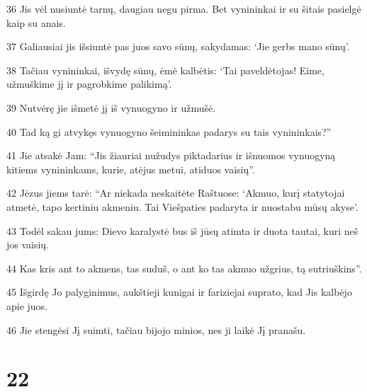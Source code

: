\par 36 Jis vėl nusiuntė tarnų, daugiau negu pirma. Bet vynininkai ir su šitais pasielgė kaip su anais. 
\par 37 Galiausiai jis išsiuntė pas juos savo sūnų, sakydamas: ‘Jie gerbs mano sūnų’. 
\par 38 Tačiau vynininkai, išvydę sūnų, ėmė kalbėtis: ‘Tai paveldėtojas! Eime, užmuškime jį ir pagrobkime palikimą’. 
\par 39 Nutvėrę jie išmetė jį iš vynuogyno ir užmušė. 
\par 40 Tad ką gi atvykęs vynuogyno šeimininkas padarys su tais vynininkais?” 
\par 41 Jie atsakė Jam: “Jis žiauriai nužudys piktadarius ir išnuomos vynuogyną kitiems vynininkams, kurie, atėjus metui, atiduos vaisių”. 
\par 42 Jėzus jiems tarė: “Ar niekada neskaitėte Raštuose: ‘Akmuo, kurį statytojai atmetė, tapo kertiniu akmeniu. Tai Viešpaties padaryta ir nuostabu mūsų akyse’. 
\par 43 Todėl sakau jums: Dievo karalystė bus iš jūsų atimta ir duota tautai, kuri neš jos vaisių. 
\par 44 Kas kris ant to akmens, tas suduš, o ant ko tas akmuo užgrius, tą sutriuškins”. 
\par 45 Išgirdę Jo palyginimus, aukštieji kunigai ir fariziejai suprato, kad Jis kalbėjo apie juos. 
\par 46 Jie stengėsi Jį suimti, tačiau bijojo minios, nes ji laikė Jį pranašu.



\chapter{22}



